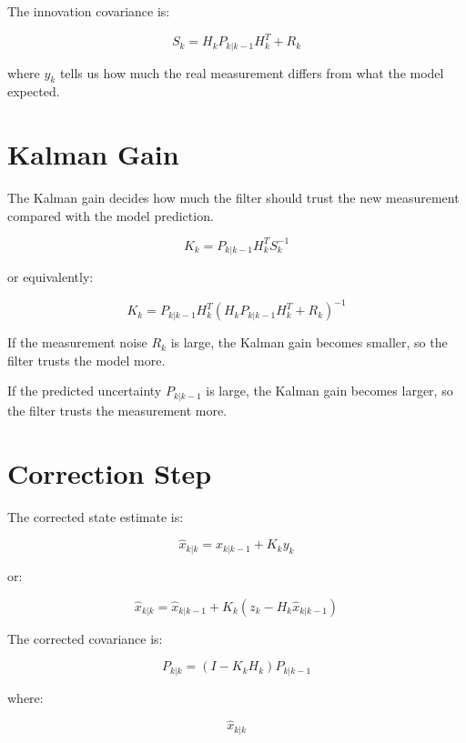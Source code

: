 \documentclass[a4paper]{article}
\begin{document}
        The innovation covariance is:
        
        \[
            S_k = H_k P_{k|k-1} H_k^T + R_k
        \]
        
        where \(y_k\) tells us how much the real measurement differs from what the model expected.
    
    
    \section{Kalman Gain}
        
        The Kalman gain decides how much the filter should trust the new measurement compared with the model prediction.
        
        \[
            K_k = P_{k|k-1} H_k^T S_k^{-1}
        \]
        
        or equivalently:
        
        \[
            K_k = P_{k|k-1} H_k^T
            \left(
                H_k P_{k|k-1} H_k^T + R_k
            \right)^{-1}
        \]
        
        If the measurement noise \(R_k\) is large, the Kalman gain becomes smaller, so the filter trusts the model more.
        
        If the predicted uncertainty \(P_{k|k-1}\) is large, the Kalman gain becomes larger, so the filter trusts the measurement more.
    
    
    \section{Correction Step}
        
        The corrected state estimate is:
        
        \[
            \hat{x}_{k|k} =
            \hat{x}_{k|k-1} + K_k y_k
        \]
        
        or:
        
        \[
            \hat{x}_{k|k} =
            \hat{x}_{k|k-1} +
            K_k
            \left(
                z_k - H_k \hat{x}_{k|k-1}
            \right)
        \]
        
        The corrected covariance is:
        
        \[
            P_{k|k} =
            \left(
                I - K_k H_k
            \right)
            P_{k|k-1}
        \]
        
        where:
        
        \[
            \hat{x}_{k|k}
        \]
        
\end{document}
